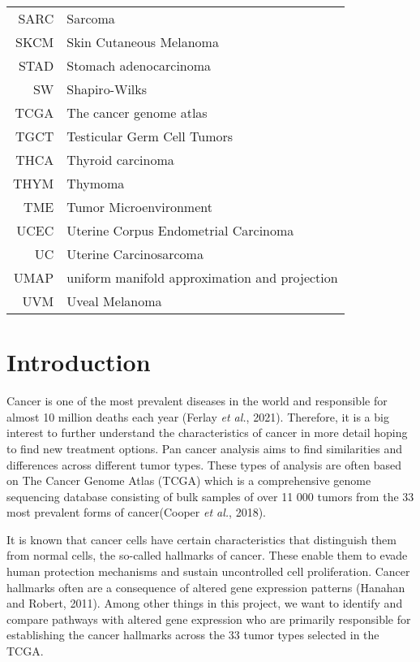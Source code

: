 \documentclass[
  parskip,
  oneside]{scrreprt}
\begin{document}
\begin{tabular}{rl}
      SARC & Sarcoma\\
      SKCM & Skin Cutaneous Melanoma\\
      STAD & Stomach adenocarcinoma\\
      SW & Shapiro-Wilks\\
      TCGA & The cancer genome atlas\\
      TGCT & Testicular Germ Cell Tumors\\
      THCA & Thyroid carcinoma\\
      THYM & Thymoma\\
      TME & Tumor Microenvironment\\
      UCEC & Uterine Corpus Endometrial Carcinoma\\
      UC & Uterine Carcinosarcoma\\
      UMAP & uniform manifold approximation and projection\\
      UVM & Uveal Melanoma\\
        \end{tabular}

\hypertarget{introduction}{%
\chapter{Introduction}\label{introduction}}

Cancer is one of the most prevalent diseases in the world and
responsible for almost 10 million deaths each year (Ferlay \emph{et
al.}, 2021). Therefore, it is a big interest to further understand the
characteristics of cancer in more detail hoping to find new treatment
options. Pan cancer analysis aims to find similarities and differences
across different tumor types. These types of analysis are often based on
The Cancer Genome Atlas (TCGA) which is a comprehensive genome
sequencing database consisting of bulk samples of over 11 000 tumors
from the 33 most prevalent forms of cancer(Cooper \emph{et al.}, 2018).

It is known that cancer cells have certain characteristics that
distinguish them from normal cells, the so-called hallmarks of cancer.
These enable them to evade human protection mechanisms and sustain
uncontrolled cell proliferation. Cancer hallmarks often are a
consequence of altered gene expression patterns (Hanahan and Robert,
2011). Among other things in this project, we want to identify and
compare pathways with altered gene expression who are primarily
responsible for establishing the cancer hallmarks across the 33 tumor
types selected in the TCGA.
\end{document}
